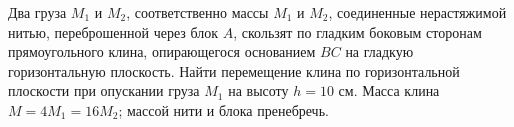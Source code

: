 Два груза $M_{1}$ и $M_{2}$, соответственно массы $M_{1}$ и $M_{2}$,
соединенные нерастяжимой нитью, переброшенной через блок $A$, скользят
по гладким боковым сторонам прямоугольного клина, опирающегося основанием
$BC$ на гладкую горизонтальную плоскость. Найти перемещение клина по 
горизонтальной плоскости при опускании груза $M_{1}$ на высоту $h=10$ см.
Масса клина $M=4M_{1}=16M_{2}$; массой нити и блока пренебречь.
